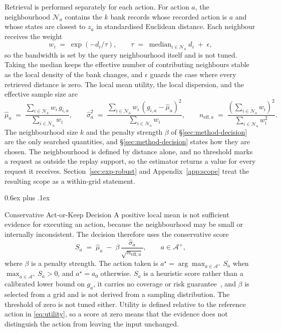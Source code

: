 \documentclass{article}
\makeatletter
\newcommand{\calA}{\mathcal{A}}
\newcommand{\calN}{\mathcal{N}}
\def\subsection{\@startsection{subsection}{2}{\z@}{-1.4ex plus -0.4ex minus -.2ex}%
  {0.6ex plus .1ex}{\normalsize\sc\raggedright}}
\makeatother
\begin{document}
Retrieval is performed separately for each action. For action $a$, the neighbourhood
$\calN_a$ contains the $k$ bank records whose recorded action is $a$ and whose states are
closest to $z_a$ in standardised Euclidean distance. Each neighbour receives the weight
\begin{equation}
  w_i \;=\; \exp\!\left(-d_i / \tau\right),
  \qquad
  \tau \;=\; \operatorname{median}_{i \in \calN_a} d_i \;+\; \epsilon ,
  \label{eq:weights}
\end{equation}
so the bandwidth is set by the query neighbourhood itself and is not tuned. Taking the median
keeps the effective number of contributing neighbours stable as the local density of the bank
changes, and $\epsilon$ guards the case where every retrieved distance is zero. The local mean
utility, the local dispersion, and the effective sample size are
\begin{equation}
  \hat\mu_a \;=\; \frac{\sum_{i \in \calN_a} w_i\, g_{i,a}}{\sum_{i \in \calN_a} w_i},
  \qquad
  \hat\sigma_a^{2} \;=\; \frac{\sum_{i \in \calN_a} w_i\, (g_{i,a} - \hat\mu_a)^{2}}{\sum_{i \in \calN_a} w_i},
  \qquad
  n_{\mathrm{eff},a} \;=\; \frac{\left(\sum_{i \in \calN_a} w_i\right)^{2}}{\sum_{i \in \calN_a} w_i^{2}} .
  \label{eq:local-moments}
\end{equation}
The neighbourhood size $k$ and the penalty strength $\beta$ of \S\ref{sec:method-decision} are
the only searched quantities, and \S\ref{sec:method-decision} states how they are chosen. The
neighbourhood is defined by distance alone, and no threshold marks a request as outside the
replay support, so the estimator returns a value for every request it receives.
Section~\ref{sec:exp-robust} and Appendix~\ref{app:scope} treat the resulting scope as a
within-grid statement.

\subsection{Conservative Act-or-Keep Decision}
\label{sec:method-decision}
A positive local mean is not sufficient evidence for executing an action, because the
neighbourhood may be small or internally inconsistent. The decision therefore uses the
conservative score
\begin{equation}
  S_a \;=\; \hat\mu_a \;-\; \beta\, \frac{\hat\sigma_a}{\sqrt{n_{\mathrm{eff},a}}},
  \qquad a \in \calA^{+},
  \label{eq:score}
\end{equation}
where $\beta$ is a penalty strength. The action taken is
$a^{\star} = \arg\max_{a \in \calA^{+}} S_a$ when $\max_{a \in \calA^{+}} S_a > 0$, and
$a^{\star} = a_0$ otherwise.
$S_a$ is a heuristic score rather than a calibrated lower bound on $g_a$, it carries no
coverage or risk guarantee~\citep{angelopoulos2024conformal}, and $\beta$ is selected from a
grid and is not derived from a sampling distribution. The threshold of zero is not tuned
either.
Utility is defined relative to the reference action in \eqref{eq:utility}, so a score at zero
means that the evidence does not distinguish the action from leaving the input unchanged.
\end{document}
